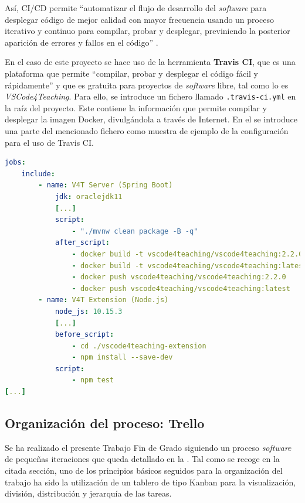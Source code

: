 Así, CI/CD permite ``automatizar el flujo de desarrollo del \textit{software} para desplegar código de mejor calidad con mayor frecuencia usando un proceso iterativo y continuo para compilar, probar y desplegar, previniendo la posterior aparición de errores y fallos en el código'' \cite{Her_CICD}.

En el caso de este proyecto se hace uso de la herramienta \textbf{Travis CI}, que es una plataforma que permite ``compilar, probar y desplegar el código fácil y rápidamente'' \cite{Her_Travis} y que es gratuita para proyectos de \textit{software} libre, tal como lo es \textit{VSCode4Teaching}.
Para ello, se introduce un fichero llamado \texttt{.travis-ci.yml} en la raíz del proyecto. Este contiene la información que permite compilar y desplegar la imagen Docker, divulgándola a través de Internet. En el  se introduce una parte del mencionado fichero como muestra de ejemplo de la configuración para el uso de Travis CI.

\begin{lstlisting}[language=YAML,caption={Fragmento del fichero de configuración de Travis CI para desplegar y divulgar la versión 2.2.0 de \textit{VSCode4Teaching}.},label=cod:travis]
jobs:
    include:
        - name: V4T Server (Spring Boot)
            jdk: oraclejdk11
            [...]
            script:
                - "./mvnw clean package -B -q"
            after_script:
                - docker build -t vscode4teaching/vscode4teaching:2.2.0 .
                - docker build -t vscode4teaching/vscode4teaching:latest .
                - docker push vscode4teaching/vscode4teaching:2.2.0
                - docker push vscode4teaching/vscode4teaching:latest
        - name: V4T Extension (Node.js)
            node_js: 10.15.3
            [...]
            before_script:
                - cd ./vscode4teaching-extension
                - npm install --save-dev
            script:
                - npm test
[...]
\end{lstlisting}

\subsection{Organización del proceso: Trello}
\label{subsec:herTrello}
Se ha realizado el presente Trabajo Fin de Grado siguiendo un proceso \textit{software} de pequeñas iteraciones que queda detallado en la . Tal como se recoge en la citada sección, uno de los principios básicos seguidos para la organización del trabajo ha sido la utilización de un tablero de tipo Kanban para la visualización, división, distribución y jerarquía de las tareas.

